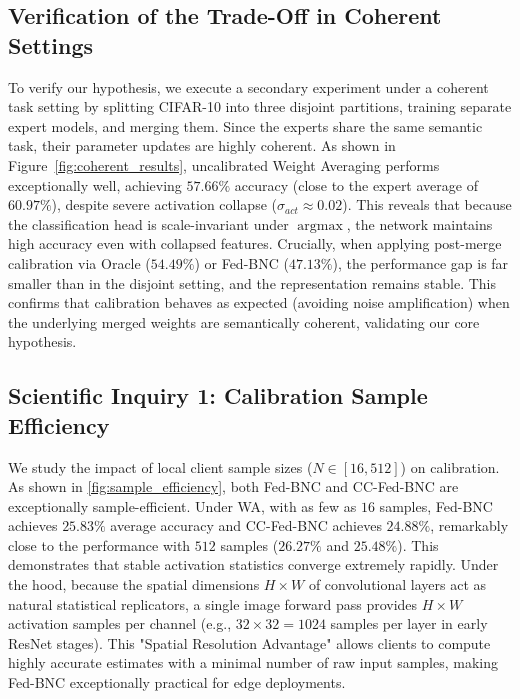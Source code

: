 \documentclass{article}
\theoremstyle{plain}
\theoremstyle{definition}
\theoremstyle{remark}
\begin{document}
\subsection{Verification of the Trade-Off in Coherent Settings}
\label{subsec:coherent_verification}
To verify our hypothesis, we execute a secondary experiment under a coherent task setting by splitting CIFAR-10 into three disjoint partitions, training separate expert models, and merging them. Since the experts share the same semantic task, their parameter updates are highly coherent. As shown in Figure~\ref{fig:coherent_results}, uncalibrated Weight Averaging performs exceptionally well, achieving $57.66\%$ accuracy (close to the expert average of $60.97\%$), despite severe activation collapse ($\sigma_{act} \approx 0.02$). This reveals that because the classification head is scale-invariant under $\operatorname{argmax}$, the network maintains high accuracy even with collapsed features. Crucially, when applying post-merge calibration via Oracle ($54.49\%$) or Fed-BNC ($47.13\%$), the performance gap is far smaller than in the disjoint setting, and the representation remains stable. This confirms that calibration behaves as expected (avoiding noise amplification) when the underlying merged weights are semantically coherent, validating our core hypothesis.

\subsection{Scientific Inquiry 1: Calibration Sample Efficiency}
We study the impact of local client sample sizes ($N \in [16, 512]$) on calibration. As shown in \cref{fig:sample_efficiency}, both Fed-BNC and CC-Fed-BNC are exceptionally sample-efficient. Under WA, with as few as $16$ samples, Fed-BNC achieves $25.83\%$ average accuracy and CC-Fed-BNC achieves $24.88\%$, remarkably close to the performance with $512$ samples ($26.27\%$ and $25.48\%$). This demonstrates that stable activation statistics converge extremely rapidly. Under the hood, because the spatial dimensions $H \times W$ of convolutional layers act as natural statistical replicators, a single image forward pass provides $H \times W$ activation samples per channel (e.g., $32 \times 32 = 1024$ samples per layer in early ResNet stages). This "Spatial Resolution Advantage" allows clients to compute highly accurate estimates with a minimal number of raw input samples, making Fed-BNC exceptionally practical for edge deployments.
\end{document}
